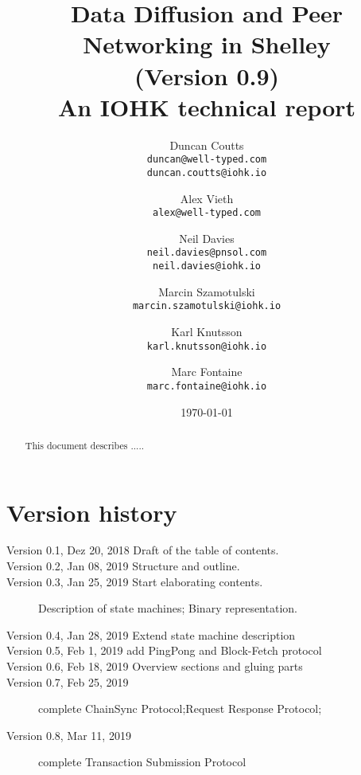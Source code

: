 \documentclass{report}
\theoremstyle{definition}{
  \newtheorem{lemma}{Lemma}[section] %
  \newtheorem{definition}[lemma]{Definition}
}
\theoremstyle{theorem}{
  \newtheorem{invariant}[lemma]{Invariant}
  \newtheorem{proofobligation}[lemma]{Proof Obligation}
}
\numberwithin{equation}{lemma}
\begin{document}
\title{Data Diffusion and Peer Networking in Shelley\\
       {\small (Version 0.9)} \\
       {\large \sc An IOHK technical report}}
\author{Duncan Coutts \\ {\small \texttt{duncan@well-typed.com}} \\
                         {\small \texttt{duncan.coutts@iohk.io}}
   \and Alex Vieth \\ {\small \texttt{alex@well-typed.com}}
   \and Neil Davies \\ {\small \texttt{neil.davies@pnsol.com}} \\
                       {\small \texttt{neil.davies@iohk.io}}
   \and Marcin Szamotulski \\ {\small \texttt{marcin.szamotulski@iohk.io}}
   \and Karl Knutsson \\ {\small \texttt{karl.knutsson@iohk.io}}
   \and Marc Fontaine \\ {\small \texttt{marc.fontaine@iohk.io}}
   }
\date{\today}

\maketitle

\begin{abstract}
  This document describes .....
\end{abstract}

\tableofcontents

\section*{Version history}

\begin{description}
\item[Version 0.1, Dez 20, 2018  Draft of the table of contents.]
\item[Version 0.2, Jan 08, 2019 Structure and outline.]
\item[Version 0.3, Jan 25, 2019 Start elaborating contents.]
  Description of state machines; Binary representation.
\item[Version 0.4, Jan 28, 2019 Extend state machine description]
\item[Version 0.5, Feb 1,  2019  add PingPong and Block-Fetch protocol]
\item[Version 0.6, Feb 18, 2019  Overview sections and gluing parts]
\item[Version 0.7, Feb 25, 2019 ]
  complete ChainSync Protocol;Request Response Protocol;
\item[Version 0.8, Mar 11, 2019 ]
  complete Transaction Submission Protocol
\end{description}
\end{document}
